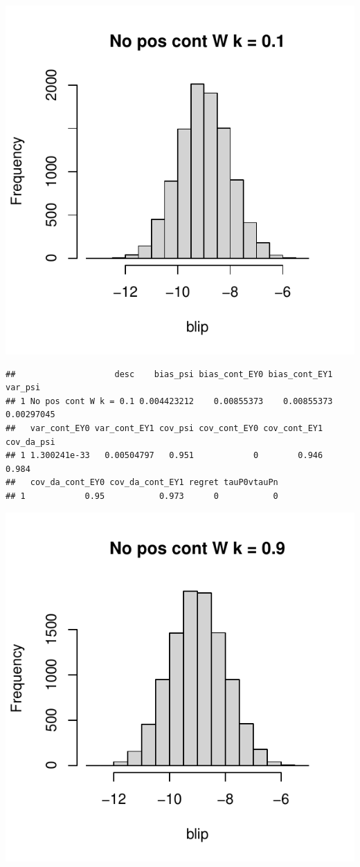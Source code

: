 \documentclass[11pt]{article}\usepackage[]{graphicx}\usepackage[table]{xcolor}
\makeatletter
\def\maxwidth{ %
  \ifdim\Gin@nat@width>\linewidth
    \linewidth
  \else
    \Gin@nat@width
  \fi
}
\newenvironment{kframe}{%
 \def\at@end@of@kframe{}%
 \ifinner\ifhmode%
  \def\at@end@of@kframe{\end{minipage}}%
  \begin{minipage}{\columnwidth}%
 \fi\fi%
 \def\FrameCommand##1{\hskip\@totalleftmargin \hskip-\fboxsep
 \colorbox{shadecolor}{##1}\hskip-\fboxsep
     \hskip-\linewidth \hskip-\@totalleftmargin \hskip\columnwidth}%
 \MakeFramed {\advance\hsize-\width
   \@totalleftmargin\z@ \linewidth\hsize
   \@setminipage}}%
 {\par\unskip\endMakeFramed%
 \at@end@of@kframe}
\newenvironment{knitrout}{}{} %
\makeatother
\begin{document}
\begin{knitrout}
\includegraphics[width=\maxwidth]{figure/unnamed-chunk-4-11} 
\begin{kframe}\begin{verbatim}
##                    desc    bias_psi bias_cont_EY0 bias_cont_EY1    var_psi
## 1 No pos cont W k = 0.1 0.004423212    0.00855373    0.00855373 0.00297045
##   var_cont_EY0 var_cont_EY1 cov_psi cov_cont_EY0 cov_cont_EY1 cov_da_psi
## 1 1.300241e-33   0.00504797   0.951            0        0.946      0.984
##   cov_da_cont_EY0 cov_da_cont_EY1 regret tauP0vtauPn
## 1            0.95           0.973      0           0
\end{verbatim}
\end{kframe}
\includegraphics[width=\maxwidth]{figure/unnamed-chunk-4-12} 

\end{knitrout}
\end{document}
